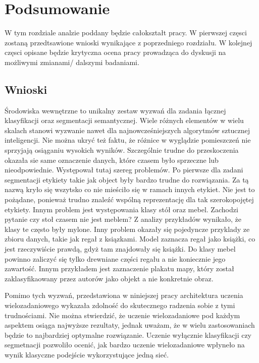 \clearpage
\newpage %
\section{Podsumowanie}



W tym rozdziale analzie poddany będzie całokształt pracy. W pierwszej częsci zostaną przedtsawione wnioski wynikające z poprzedniego rozdziału. W kolejnej częsci opisane będzie krytyczna ocena pracy prowadząca do dyskusji na możliwymi zmianami/ dalszymi badaniami. 

\subsection{Wnioski}

Środowiska wewnętrzne to unikalny zestaw wyzwań dla zadania łącznej klasyfikacji oraz segmentacji semantycznej. Wiele różnych elementów w wielu skalach stanowi wyzwanie nawet dla najnowcześniejszych algorytmów sztucznej inteligencji. Nie można ukryć też faktu, że różnice w wyglądzie pomieszczeń nie sprzyjają osiąganiu wysokich wyników. Szczególnie trudne do przeskoczenia okazała sie same oznaczenie danych, które czasem było sprzeczne lub nieodpowiednie. Występował tutaj szereg problemów. Po pierwsze dla zadani segmentacji etykiety takie jak object były bardzo trudne do rozwiązania. Za tą nazwą kryło się wszytsko co nie mieściło się w ramach innych etykiet. Nie jest to pożądane, ponieważ trudno znaleźć wspólną reprezentację dla tak szerokopojętej etykiety. Innym problem jest występowania klasy stół oraz mebel. Zachodzi pytanie czy stoł czasem nie jest meblem? Z analizy przykładów wynikało, że klasy te często były mylone. Inny problem okazały się pojedyncze przyklady ze zbioru danych, takie jak regał z ksiązkami. Model zaznacza regał jako książki, co jest rzeczywiście prawdą, gdyż tam znajdowały się książki. Do klasy mebel powinno zaliczyć się tylko drewniane części regału a nie koniecznie jego zawartość. Innym przykładem jest zaznaczenie plakatu mapy, który został zaklasyfikaowany przez autorów jako objekt a nie konkretnie obraz.

Pomimo tych wyzwań, przedstawiona w niniejszej pracy architektura uczenia wielozadaniowego wykazała zdolność do skutecznego radzenia sobie z tymi trudnościami. Nie można stwierdzić, że uczenie wielozadaniowe pod każdym aspektem osiąga najwyższe rezultaty, jednak uważam, że w wielu zastosowaniach będzie to najbardziej optymalne rozwiązanie. Uczenie wyłącznie klasyfikacji czy segmetnacji pozwoliło ocenić, jak bardzo uczenie wielozadaniowe wpłyneło na wynik klasyczne podejście wykorzystujące jedną sieć.

